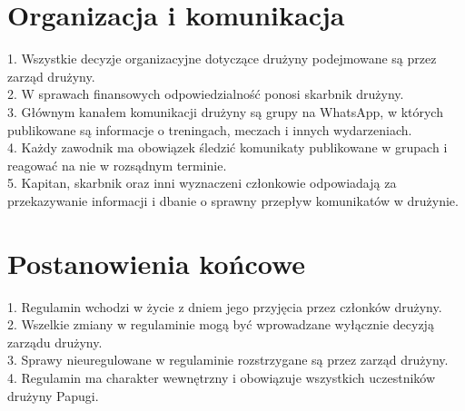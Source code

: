 \documentclass[12pt,a4paper]{article}
\begin{document}
\section{Organizacja i komunikacja}
1. Wszystkie decyzje organizacyjne dotyczące drużyny podejmowane są przez zarząd drużyny.\\
2. W sprawach finansowych odpowiedzialność ponosi skarbnik drużyny.\\
3. Głównym kanałem komunikacji drużyny są grupy na WhatsApp, w których publikowane są informacje o treningach, meczach i innych wydarzeniach.\\
4. Każdy zawodnik ma obowiązek śledzić komunikaty publikowane w grupach i reagować na nie w rozsądnym terminie.\\
5. Kapitan, skarbnik oraz inni wyznaczeni członkowie odpowiadają za przekazywanie informacji i dbanie o sprawny przepływ komunikatów w drużynie.

\section{Postanowienia końcowe}
1. Regulamin wchodzi w życie z dniem jego przyjęcia przez członków drużyny.\\
2. Wszelkie zmiany w regulaminie mogą być wprowadzane wyłącznie decyzją zarządu drużyny.\\
3. Sprawy nieuregulowane w regulaminie rozstrzygane są przez zarząd drużyny.\\
4. Regulamin ma charakter wewnętrzny i obowiązuje wszystkich uczestników drużyny Papugi.
\end{document}
